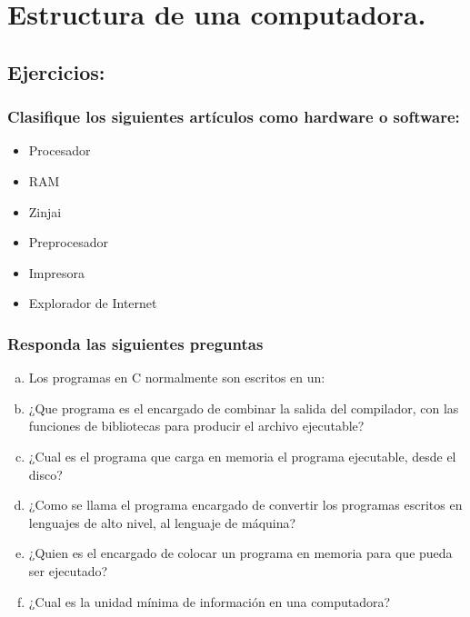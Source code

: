 \section{Estructura de una computadora.}

\subsection{Ejercicios:}

\subsubsection{Clasifique los siguientes artículos como hardware o software:}
\begin{itemize}
  \item Procesador
  \item RAM
  \item Zinjai
  \item Preprocesador
  \item Impresora
  \item Explorador de Internet
\end{itemize}

\subsubsection{Responda las siguientes preguntas}
\begin{enumerate}[a)]
  \item Los programas en C normalmente son escritos en un:
  \item ¿Que programa es el encargado de combinar la salida del compilador, con las funciones de bibliotecas para producir el archivo ejecutable?
  \item ¿Cual es el programa que carga en memoria el programa ejecutable, desde el disco?
  \item ¿Como se llama el programa encargado de convertir los programas escritos en lenguajes de alto nivel, al lenguaje 
    de máquina?
  \item ¿Quien es el encargado de colocar un programa en memoria para que pueda ser ejecutado?
  \item ¿Cual es la unidad mínima de información en una computadora?
\end{enumerate}

